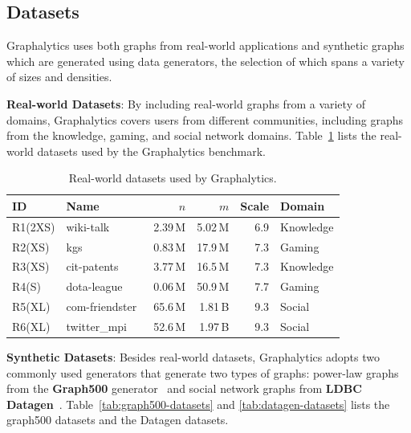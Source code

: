 \subsection{Datasets}\label{sec:definition_datasets}
Graphalytics uses both graphs from real-world applications and synthetic graphs which are generated using data generators, the selection of which spans a variety of sizes and densities.

\textbf{Real-world Datasets}: By including real-world graphs from a variety of domains, Graphalytics covers users from different communities, including graphs from the knowledge, gaming, and social network domains.  Table~\ref{tab:real-datasets} lists the real-world datasets used by the Graphalytics benchmark.

\begin{table}[h]
\caption{Real-world datasets used by Graphalytics.}
\label{tab:real-datasets}
\centering
\begin{tabular}{|l|l|r|r|r|l|}
\hline
\textbf{ID} & \textbf{Name} & \textbf{$n$} & \textbf{$m$} & \textbf{Scale} & \textbf{Domain} \\
\hline
R1(2XS) & wiki-talk~\cite{snapnets} & 2.39\,M & 5.02\,M & 6.9 & Knowledge \\
\hline
R2(XS) & kgs~\cite{guo2012game} & 0.83\,M & 17.9\,M & 7.3 & Gaming \\
\hline
R3(XS) & cit-patents~\cite{snapnets} & 3.77\,M & 16.5\,M & 7.3 & Knowledge \\
\hline
R4(S) & dota-league~\cite{guo2012game} & 0.06\,M & 50.9\,M & 7.7 & Gaming \\
\hline
R5(XL) & com-friendster~\cite{snapnets} & 65.6\,M & 1.81\,B & 9.3 & Social \\
\hline
R6(XL) & twitter\_mpi~\cite{icwsm10cha} & 52.6\,M & 1.97\,B & 9.3 & Social \\
\hline
\end{tabular}
\end{table}





\textbf{Synthetic Datasets}: Besides real-world datasets, Graphalytics adopts two commonly used generators that generate two types of graphs: power-law graphs from the \textbf{Graph500} generator~\cite{chakrabarti2004, murphy2010} and social network graphs from \textbf{LDBC Datagen}~\cite{DBLP:conf/sigmod/ErlingALCGPPB15}. Table~\ref{tab:graph500-datasets} and \ref{tab:datagen-datasets} lists the graph500 datasets and the Datagen datasets.



